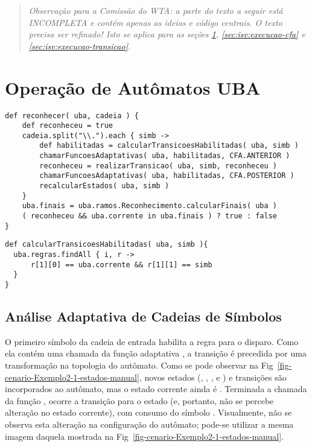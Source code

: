 
   \begin{quote}
   \textit{Observação para a Comissão do WTA: a parte do texto a seguir está INCOMPLETA e contém apenas as ideias e código centrais. O texto precisa ser refinado! Isto se aplica para as seções \ref{sec:isv:execucao-uba}, \ref{sec:isv:execucao-cfa} e \ref{sec:isv:execucao-transicao}.}
   \end{quote}

\section{Operação de Autômatos UBA}
\label{sec:isv:execucao-uba}


\begin{lstlisting}
def reconhecer( uba, cadeia ) {
    def reconheceu = true
    cadeia.split("\\.").each { simb ->
        def habilitadas = calcularTransicoesHabilitadas( uba, simb )
        chamarFuncoesAdaptativas( uba, habilitadas, CFA.ANTERIOR )
        reconheceu = realizarTransicao( uba, simb, reconheceu )
        chamarFuncoesAdaptativas( uba, habilitadas, CFA.POSTERIOR )
        recalcularEstados( uba, simb )
    }
    uba.finais = uba.ramos.Reconhecimento.calcularFinais( uba )
    ( reconheceu && uba.corrente in uba.finais ) ? true : false
}
\end{lstlisting}


\begin{lstlisting}
def calcularTransicoesHabilitadas( uba, simb ){
  uba.regras.findAll { i, r ->
      r[1][0] == uba.corrente && r[1][1] == simb
  }
}
\end{lstlisting}

\subsection*{Análise Adaptativa de Cadeias de Símbolos}


O primeiro símbolo  da cadeia de entrada habilita a regra  para o disparo. Como ela contém uma chamada da função adaptativa , a transição é precedida por uma transformação na topologia do autômato. Como se pode observar na Fig~\ref{fig-cenario-Exemplo2-1-estados-manual}, novos estados (, , ,  e ) e transições são incorporados ao autômato, mas o estado corrente ainda é . Terminada a chamada da função , ocorre a transição para o estado  (e, portanto, não se percebe alteração no estado corrente), com consumo do símbolo . Visualmente, não se observa esta alteração na configuração do autômato; pode-se utilizar a mesma imagem daquela mostrada na Fig~\ref{fig-cenario-Exemplo2-1-estados-manual}.

